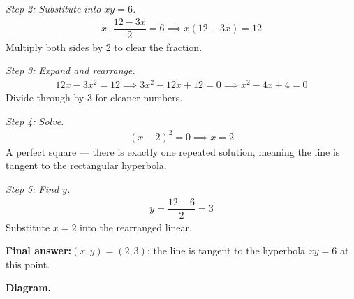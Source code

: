 \documentclass[11pt]{article}
\begin{document}
\textit{Step 2: Substitute into \( xy = 6 \).}
\[\begin{gathered}
x \cdot \dfrac{12 - 3x}{2} = 6 \implies x(12 - 3x) = 12
\end{gathered}\]
Multiply both sides by 2 to clear the fraction.

\textit{Step 3: Expand and rearrange.}
\[\begin{gathered}
12x - 3x^2 = 12 \implies 3x^2 - 12x + 12 = 0 \implies x^2 - 4x + 4 = 0
\end{gathered}\]
Divide through by 3 for cleaner numbers.

\textit{Step 4: Solve.}
\[\begin{gathered}
(x - 2)^2 = 0 \implies x = 2
\end{gathered}\]
A perfect square --- there is exactly one repeated solution, meaning the line is tangent to the rectangular hyperbola.

\textit{Step 5: Find \( y \).}
\[\begin{gathered}
y = \dfrac{12 - 6}{2} = 3
\end{gathered}\]
Substitute \( x = 2 \) into the rearranged linear.

\begin{answerbox}
\textbf{Final answer:}\quad \(\displaystyle (x, y) = (2, 3)\); the line is tangent to the hyperbola \(\displaystyle xy = 6\) at this point.
\end{answerbox}
\textbf{Diagram.}
\end{document}
